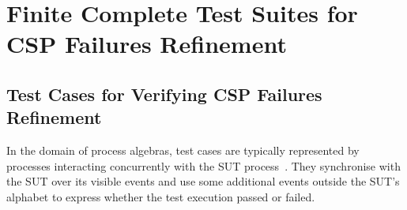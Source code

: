 \section{Finite Complete Test Suites for CSP Failures Refinement}
\label{sec:finitecompletefails}


\subsection{Test Cases for Verifying CSP Failures Refinement}

In the domain of process algebras, test cases are typically represented 
by processes interacting concurrently with the SUT 
process~\cite{Hennessy:1988:ATP:50497}. They synchronise with the SUT over its visible events and use some additional events outside the SUT's alphabet to express whether the test execution  passed or failed. %

